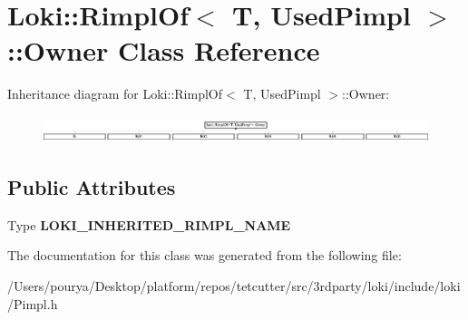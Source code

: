 \hypertarget{classLoki_1_1RimplOf_1_1Owner}{}\section{Loki\+:\+:Rimpl\+Of$<$ T, Used\+Pimpl $>$\+:\+:Owner Class Reference}
\label{classLoki_1_1RimplOf_1_1Owner}
Inheritance diagram for Loki\+:\+:Rimpl\+Of$<$ T, Used\+Pimpl $>$\+:\+:Owner\+:\begin{figure}[H]
\begin{center}
\leavevmode
\includegraphics[height=0.794326cm]{classLoki_1_1RimplOf_1_1Owner}
\end{center}
\end{figure}
\subsection*{Public Attributes}
\begin{DoxyCompactItemize}
\item 
\hypertarget{classLoki_1_1RimplOf_1_1Owner_ab922729621b92d64018daa5339a8fd8a}{}Type {\bfseries L\+O\+K\+I\+\_\+\+I\+N\+H\+E\+R\+I\+T\+E\+D\+\_\+\+R\+I\+M\+P\+L\+\_\+\+N\+A\+M\+E}\label{classLoki_1_1RimplOf_1_1Owner_ab922729621b92d64018daa5339a8fd8a}

\end{DoxyCompactItemize}


The documentation for this class was generated from the following file\+:\begin{DoxyCompactItemize}
\item 
/\+Users/pourya/\+Desktop/platform/repos/tetcutter/src/3rdparty/loki/include/loki/Pimpl.\+h\end{DoxyCompactItemize}
